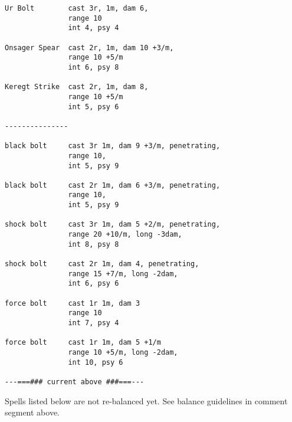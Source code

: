 


\small \begin{verbatim}
Ur Bolt        cast 3r, 1m, dam 6,
               range 10
               int 4, psy 4

Onsager Spear  cast 2r, 1m, dam 10 +3/m,
               range 10 +5/m
               int 6, psy 8

Keregt Strike  cast 2r, 1m, dam 8,
               range 10 +5/m
               int 5, psy 6

---------------

black bolt     cast 3r 1m, dam 9 +3/m, penetrating,
               range 10, 
               int 5, psy 9

black bolt     cast 2r 1m, dam 6 +3/m, penetrating,
               range 10,
               int 5, psy 9

shock bolt     cast 3r 1m, dam 5 +2/m, penetrating,
               range 20 +10/m, long -3dam,
               int 8, psy 8

shock bolt     cast 2r 1m, dam 4, penetrating,
               range 15 +7/m, long -2dam,
               int 6, psy 6

force bolt     cast 1r 1m, dam 3
               range 10
               int 7, psy 4

force bolt     cast 1r 1m, dam 5 +1/m
               range 10 +5/m, long -2dam,
               int 10, psy 6

---===### current above ###===---
\end{verbatim} \normalsize
\noindent Spells listed below are not re-balanced yet.
See balance guidelines in comment segment above.

